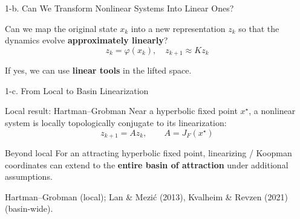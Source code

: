 \documentclass[aspectratio=169, 10pt]{beamer}
\begin{document}
\begin{frame}{1-b. Can We Transform Nonlinear Systems Into Linear Ones?}

Can we map the original state $x_k$ into a new representation $z_k$
so that the dynamics evolve \textbf{approximately linearly}?
\[
z_k = \varphi(x_k), \quad z_{k+1} \approx K z_k
\]


\centering
If yes, we can use \textbf{linear tools} in the lifted space.

\vspace{0.7em}


\end{frame}


\begin{frame}{1-c. From Local to Basin Linearization}

\begin{block}{Local result: Hartman--Grobman}
Near a hyperbolic fixed point $x^\star$, a nonlinear system is locally
topologically conjugate to its linearization:
\[
z_{k+1} = A z_k, \qquad A = J_F(x^\star)
\]
\end{block}

\vspace{0.4em}

\begin{block}{Beyond local}
For an attracting hyperbolic fixed point, linearizing / Koopman coordinates
can extend to the \textbf{entire basin of attraction} under additional assumptions.
\end{block}

\vspace{0.4em}
\centering


\vspace{1.2em}
\footnotesize
Hartman--Grobman (local); Lan \& Mezi\'c (2013), Kvalheim \& Revzen (2021) (basin-wide).

\end{frame}
\end{document}
